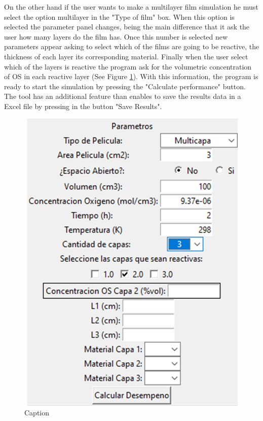 On the other hand if the user wants to make a multilayer film simulation he must select the option multilayer in the "Type of film" box. When this option is selected the parameter panel changes, being the main difference that it ask the user how many layers do the film has. Once this number is selected new parameters appear asking to select which of the films are going to be reactive, the thickness of each layer its corresponding material. Finally when the user select which of the layers is reactive the program ask for the volumetric concentration of OS in each reactive layer (See Figure \ref{fig:multilayer_panel}). With this information, the program is ready to start the simulation by pressing the "Calculate performance" button. The tool has an additional feature than enables to save the results data in a Excel file by pressing in the button "Save Results". 

\begin{figure}[ht]
    \centering
    \includegraphics[scale=0.6]{Documento_Latex/Imagenes/multilayer_panel.png}
    \caption{Caption}
    \label{fig:multilayer_panel}
\end{figure}